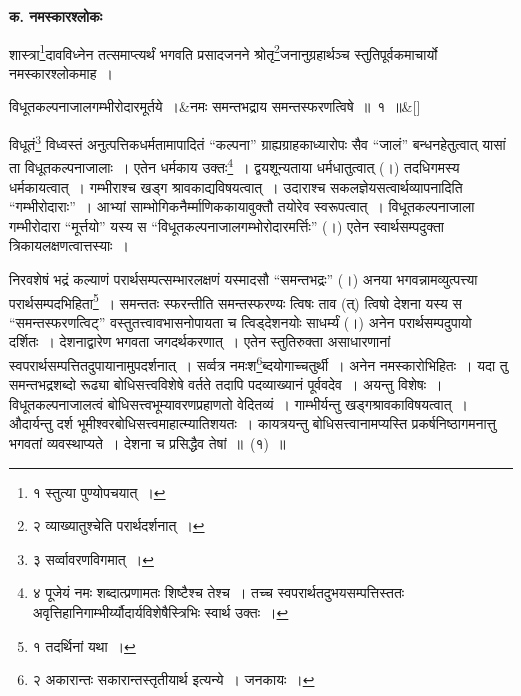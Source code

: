 \documentclass[article,12pt,a4paper]{memoir}
\begin{document}
	\label{div_pvv.1.1}
	  
	

	  \begin{center}%
	\textbf{क. नमस्कारश्लोकः}
	\end{center}
	

	  \pstart शास्त्रा\footnote{\label{pvv.1-1}  १ स्तुत्या पुण्योपचयात् ।}दावविध्नेन तत्समाप्त्यर्थं भगवति प्रसादजनने श्रोतृ\footnote{\label{pvv.1-2}  २ व्याख्यातुश्चेति परार्थदर्शनात् ।}जनानुग्रहार्थञ्च स्तुतिपूर्वकमाचार्यो नमस्कारश्लोकमाह ।
	\pend
      
	  \bigskip
	  \begingroup
	
	    \large
	  
	    
	    \stanza[\smallbreak]
	विधूतकल्पनाजालगम्भीरोदारमूर्तये ।&नमः समन्तभद्राय समन्तस्फरणत्विषे ॥ १ ॥\&[\smallbreak]


	
	  \endgroup
	

	  \pstart विधूतं\footnote{\label{pvv.1-3}  ३ सर्व्वावरणविगमात् ।} विध्वस्तं अनुत्पत्तिकधर्मतामापादितं {\color{DodgerBlue3}“कल्पना”} ग्राह्यग्राहकाध्यारोपः सैव {\color{DodgerBlue3}“जालं”} बन्धनहेतुत्वात् यासां ता विधूतकल्पनाजालाः । एतेन धर्मकाय उक्तः\footnote{\label{pvv.1-4}  ४ पूजेयं नमः शब्दात्प्रणामतः शिष्टैश्च तेश्च । तच्च स्वपरार्थतदुभयसम्पत्तिस्ततः अवृत्तिहानिगाम्भीर्य्यौदार्यविशेषैस्त्रिभिः स्वार्थ उक्तः ।} । द्वयशून्यताया धर्मधातुत्वात् (।) तदधिगमस्य धर्मकायत्वात् । गम्भीराश्च खड्ग\leavevmode{} श्रावकाद्यविषयत्वात् । उदाराश्च सकलज्ञेयसत्वार्थव्यापनादिति {\color{DodgerBlue3}“गम्भीरोदाराः”} । आभ्यां साम्भोगिकनैर्म्माणिककायावुक्तौ तयोरेव स्वरूपत्वात् । विधूतकल्पनाजाला गम्भीरोदारा {\color{DodgerBlue3}“मूर्त्तयो”} यस्य स {\color{DodgerBlue3}“विधूतकल्पनाजालगम्भोरोदारमर्त्तिः”} (।) एतेन स्वार्थसम्पदुक्ता त्रिकायलक्षणत्वात्तस्याः ।
	\pend
      

	   निरवशेषं भद्रं कल्याणं परार्थसम्पत्सम्भारलक्षणं यस्मादसौ {\color{DodgerBlue3}“समन्तभद्रः”} (।) अनया भगवन्नामव्युत्पत्त्या परार्थसम्पदभिहिता\footnote{\label{pvv.2-1}  १ तदर्थिनां यथा ।} । समन्ततः स्फरन्तीति समन्तस्फरण्यः त्विषः ताव (त्) त्विषो देशना यस्य स {\color{DodgerBlue3}“समन्तस्फरणत्विट्”} वस्तुतत्त्वावभासनोपायता च त्विड्देशनयोः साधर्म्यं (।) अनेन परार्थसम्पदुपायो दर्शितः । देशनाद्वारेण भगवता जगदर्थकरणात् । एतेन स्तुतिरुक्ता असाधारणानां स्वपरार्थसम्पत्तितदुपायानामुपदर्शनात् । सर्व्वत्र नमःश\footnote{\label{pvv.2-2}  २ अकारान्तः सकारान्तस्तृतीयार्थ इत्यन्ये । जनकायः ।}ब्दयोगाच्चतुर्थी । अनेन नमस्कारोभिहितः । यदा तु समन्तभद्रशब्दो रूढ्या बोधिसत्त्वविशेषे वर्तते तदापि पदव्याख्यानं पूर्ववदेव । अयन्तु विशेषः । विधूतकल्पनाजालत्वं बोधिसत्त्वभूम्यावरणप्रहाणतो वेदितव्यं । गाम्भीर्यन्तु खड्गश्रावकाविषयत्वात् । औदार्यन्तु दर्श भूमीश्वरबोधिसत्त्वमाहात्म्यातिशयतः । कायत्रयन्तु बोधिसत्त्वानामप्यस्ति प्रकर्षनिष्ठागमनात्तु भगवतां व्यवस्थाप्यते । देशना च प्रसिद्धैव तेषां ॥ (१) ॥
	\pend
      \label{div_pvv.1.2}
	  
\end{document}
